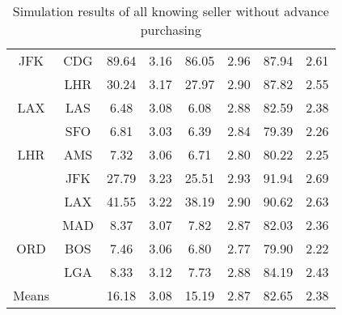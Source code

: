 \begin{table}
\begin{center}
\begin{tabular}{c c | c c | c c | c | c }
JFK  &  CDG  &   89.64  &  3.16  &   86.05  &  2.96  &  87.94  &  2.61 \\
~    &  LHR  &   30.24  &  3.17  &   27.97  &  2.90  &  87.82  &  2.55 \\[.5ex]
LAX  &  LAS  &    6.48  &  3.08  &    6.08  &  2.88  &  82.59  &  2.38 \\
~    &  SFO  &    6.81  &  3.03  &    6.39  &  2.84  &  79.39  &  2.26 \\[.5ex]
LHR  &  AMS  &    7.32  &  3.06  &    6.71  &  2.80  &  80.22  &  2.25 \\
~    &  JFK  &   27.79  &  3.23  &   25.51  &  2.93  &  91.94  &  2.69 \\
~    &  LAX  &   41.55  &  3.22  &   38.19  &  2.90  &  90.62  &  2.63 \\
~    &  MAD  &    8.37  &  3.07  &    7.82  &  2.87  &  82.03  &  2.36 \\[.5ex]
ORD  &  BOS  &    7.46  &  3.06  &    6.80  &  2.77  &  79.90  &  2.22 \\
~    &  LGA  &    8.33  &  3.12  &    7.73  &  2.88  &  84.19  &  2.43 \\
\midrule
Means &  ~   &   16.18  &  3.08  &   15.19  &  2.87  &  82.65  &  2.38 \\
    \bottomrule
\end{tabular}
\caption{Simulation results of all knowing seller without advance purchasing}
\label{tbl:resultsSecond}
\end{center}
\end{table}


